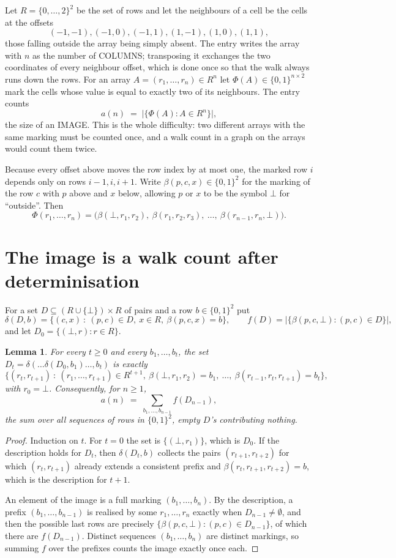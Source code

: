 \documentclass[11pt,a4paper]{article}
\theoremstyle{plain}
\newtheorem{lemma}[theorem]{Lemma}
\theoremstyle{definition}
\begin{document}
Let $R=\{0,\dots,2\}^{2}$ be the set of rows and let the neighbours of a cell be the
cells at the offsets
\[
(-1,-1), (-1,0), (-1,1), (1,-1), (1,0), (1,1),
\]
those falling outside the array being simply absent. The entry writes the array with $n$ as the number of COLUMNS; transposing it exchanges the two coordinates of every neighbour offset, which is done once so that the walk always runs down the rows. For an array
$A=(r_1,\dots,r_n)\in R^n$ let $\Phi(A)\in\{0,1\}^{n\times2}$ mark the cells whose value
is equal to exactly two of its neighbours. The entry counts
\[
a(n)\;=\;\bigl|\{\Phi(A):A\in R^n\}\bigr| ,
\]
the size of an IMAGE. This is the whole difficulty: two different arrays with the same marking
must be counted once, and a walk count in a graph on the arrays would count them twice.

Because every offset above moves the row index by at most one, the marked row $i$ depends only
on rows $i-1,i,i+1$. Write $\beta(p,c,x)\in\{0,1\}^{2}$ for the marking of the row $c$
with $p$ above and $x$ below, allowing $p$ or $x$ to be the symbol $\bot$ for ``outside''.
Then
\[
\Phi(r_1,\dots,r_n)=\bigl(\beta(\bot,r_1,r_2),\ \beta(r_1,r_2,r_3),\ \dots,\
\beta(r_{n-1},r_n,\bot)\bigr).
\]

\section{The image is a walk count after determinisation}

For a set $D\subseteq(R\cup\{\bot\})\times R$ of pairs and a row $b\in\{0,1\}^{2}$ put
\[
\delta(D,b)=\{(c,x)\ :\ (p,c)\in D,\ x\in R,\ \beta(p,c,x)=b\},\qquad
f(D)=\bigl|\{\beta(p,c,\bot):(p,c)\in D\}\bigr| ,
\]
and let $D_0=\{(\bot,r):r\in R\}$.

\begin{lemma}\label{lem:det}
For every $t\ge0$ and every $b_1,\dots,b_t$, the set
$D_t=\delta(\dots\delta(D_0,b_1)\dots,b_t)$ is exactly
\[
\{(r_t,r_{t+1})\ :\ (r_1,\dots,r_{t+1})\in R^{t+1},\ \beta(\bot,r_1,r_2)=b_1,\ \dots,\
\beta(r_{t-1},r_t,r_{t+1})=b_t\} ,
\]
with $r_0=\bot$. Consequently, for $n\ge1$,
\[
a(n)\;=\;\sum_{b_1,\dots,b_{n-1}}f(D_{n-1}),
\]
the sum over all sequences of rows in $\{0,1\}^{2}$, empty $D$'s contributing nothing.
\end{lemma}

\begin{proof}
Induction on $t$. For $t=0$ the set is $\{(\bot,r_1)\}$, which is $D_0$. If the description
holds for $D_t$, then $\delta(D_t,b)$ collects the pairs $(r_{t+1},r_{t+2})$ for which
$(r_t,r_{t+1})$ already extends a consistent prefix and
$\beta(r_t,r_{t+1},r_{t+2})=b$, which is the description for $t+1$.

An element of the image is a full marking $(b_1,\dots,b_n)$. By the description, a prefix
$(b_1,\dots,b_{n-1})$ is realised by some $r_1,\dots,r_n$ exactly when $D_{n-1}\neq
\emptyset$, and then the possible last rows are precisely
$\{\beta(p,c,\bot):(p,c)\in D_{n-1}\}$, of which there are $f(D_{n-1})$. Distinct
sequences $(b_1,\dots,b_n)$ are distinct markings, so summing $f$ over the prefixes counts the
image exactly once each.
\end{proof}
\end{document}
